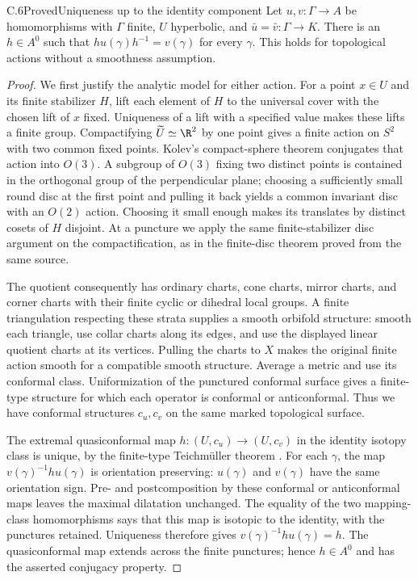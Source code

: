 \begin{claim}{C.6}{Proved}{Uniqueness up to the identity component}
Let $u,v:\Gamma\to A$ be homomorphisms with $\Gamma$ finite, $U$
hyperbolic, and $\bar u=\bar v:\Gamma\to K$. There is an
$h\in A^0$ such that $h u(\gamma)h^{-1}=v(\gamma)$ for every $\gamma$.
This holds for topological actions without a smoothness assumption.
\end{claim}
\begin{proof}
We first justify the analytic model for either action. For a point
$x\in U$ and its finite stabilizer $H$, lift each element of $H$ to the
universal cover with the chosen lift of $x$ fixed. Uniqueness of a lift
with a specified value makes these lifts a finite group. Compactifying
$\widetilde U\simeq\R^2$ by one point gives a finite action on $S^2$
with two common fixed points. Kolev's compact-sphere theorem
\cite[Theorem 1.2]{C_Kolev2006} conjugates that action into $O(3)$.
A subgroup of $O(3)$ fixing two distinct points is contained in the
orthogonal group of the perpendicular plane; choosing a sufficiently
small round disc at the first point and pulling it back yields a common
invariant disc with an $O(2)$ action. Choosing it small enough makes its
translates by distinct cosets of $H$ disjoint. At a puncture we apply the
same finite-stabilizer disc argument on the compactification, as in the
finite-disc theorem proved from the same source.

The quotient consequently has ordinary charts, cone charts, mirror
charts, and corner charts with their finite cyclic or dihedral local
groups. A finite triangulation respecting these strata supplies a
smooth orbifold structure: smooth each triangle, use collar charts
along its edges, and use the displayed linear quotient charts at its
vertices. Pulling the charts to $X$ makes the original finite action
smooth for a compatible smooth structure. Average a metric and use its
conformal class. Uniformization of the punctured conformal surface gives
a finite-type structure for which each operator is conformal or
anticonformal. Thus we have conformal structures $c_u,c_v$ on the same
marked topological surface.

The extremal quasiconformal map $h:(U,c_u)\to(U,c_v)$ in the identity
isotopy class is unique, by the finite-type Teichm\"uller theorem
\cite[\S3(A)--(D)]{C_Bers1981}. For each $\gamma$, the map
$v(\gamma)^{-1}h u(\gamma)$ is orientation preserving: $u(\gamma)$ and
$v(\gamma)$ have the same orientation sign. Pre- and postcomposition by
these conformal or anticonformal maps leaves the maximal dilatation
unchanged. The equality of the two mapping-class homomorphisms says
that this map is isotopic to the identity, with the punctures retained.
Uniqueness therefore gives $v(\gamma)^{-1}h u(\gamma)=h$. The
quasiconformal map extends across the finite punctures; hence
$h\in A^0$ and has the asserted conjugacy property.
\end{proof}

